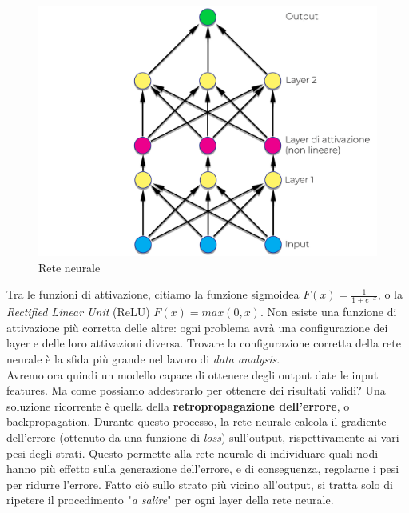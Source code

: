 \begin{figure}[H]
    \begin{center}
        \includegraphics[width=0.8\columnwidth]{images/stateofart/real-NN.png}
    \end{center}
    \caption{Rete neurale}
    \label{fig:real-NN}
\end{figure}
Tra le funzioni di attivazione, citiamo la funzione sigmoidea $F(x)=\frac{1}{1+e^{-x}}$, o la \textit{Rectified Linear Unit} (ReLU) $F(x)=max(0,x)$. Non esiste una funzione di attivazione più corretta delle altre: ogni problema avrà una configurazione dei layer e delle loro attivazioni diversa. Trovare la configurazione corretta della rete neurale è la sfida più grande nel lavoro di \textit{data analysis}. \\
Avremo ora quindi un modello capace di ottenere degli output date le input features. Ma come possiamo addestrarlo per ottenere dei risultati validi? Una soluzione ricorrente è quella della \textbf{retropropagazione dell'errore}, o backpropagation. Durante questo processo, la rete neurale calcola il gradiente dell'errore (ottenuto da una funzione di \textit{loss}) sull'output, rispettivamente ai vari pesi degli strati. Questo permette alla rete neurale di individuare quali nodi hanno più effetto sulla generazione dell'errore, e di conseguenza, regolarne i pesi per ridurre l'errore. Fatto ciò sullo strato più vicino all'output, si tratta solo di ripetere il procedimento "\textit{a salire}" per ogni layer della rete neurale.
